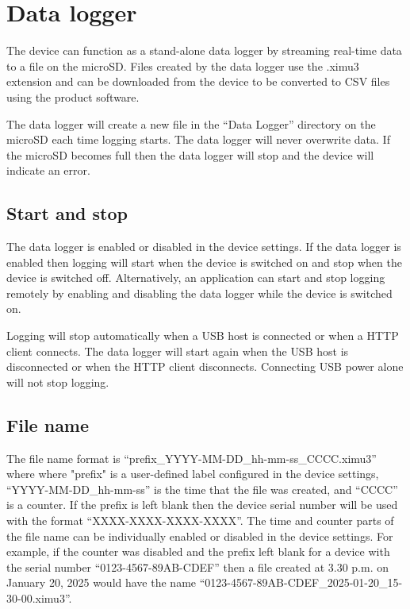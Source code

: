 \section{Data logger}

The device can function as a stand-alone data logger by streaming real-time data to a file on the \ac{microSD}.  Files created by the data logger use the .ximu3 extension and can be downloaded from the device to be converted to \ac{CSV} files using the product software.

The data logger will create a new file in the \enquote{Data Logger} directory on the \ac{microSD} each time logging starts.  The data logger will never overwrite data.  If the \ac{microSD} becomes full then the data logger will stop and the device will indicate an error.

\subsection{Start and stop}

The data logger is enabled or disabled in the device settings.  If the data logger is enabled then logging will start when the device is switched on and stop when the device is switched off.  Alternatively, an application can start and stop logging remotely by enabling and disabling the data logger while the device is switched on.

Logging will stop automatically when a \ac{USB} host is connected or when a \ac{HTTP} client connects.  The data logger will start again when the \ac{USB} host is disconnected or when the \ac{HTTP} client disconnects.  Connecting \ac{USB} power alone will not stop logging.

\subsection{File name}

The file name format is \enquote{prefix\_YYYY-MM-DD\_hh-mm-ss\_CCCC.ximu3} where where "prefix" is a user-defined label configured in the device settings, \enquote{YYYY-MM-DD\_hh-mm-ss} is the time that the file was created, and \enquote{CCCC} is a counter.  If the prefix is left blank then the device serial number will be used with the format \enquote{XXXX-XXXX-XXXX-XXXX}.  The time and counter parts of the file name can be individually enabled or disabled in the device settings.  For example, if the counter was disabled and the prefix left blank for a device with the serial number \enquote{0123-4567-89AB-CDEF} then a file created at 3.30 p.m. on January 20, 2025 would have the name \enquote{0123-4567-89AB-CDEF\_2025-01-20\_15-30-00.ximu3}.

